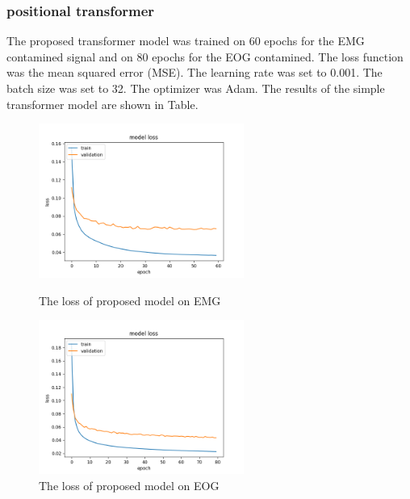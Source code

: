 \documentclass[a4paper]{sapthesis}
\begin{document}
\subsubsection{positional transformer}\label{sec:positional_transformer}
The proposed transformer  model was trained on 60 
epochs for the EMG contamined signal and on 80 epochs 
for the EOG contamined. The loss function was the mean squared error (MSE). The 
learning rate
was set to 0.001. The batch size was set to 32. The optimizer was Adam. 
The results of the simple transformer model are shown in Table.
\begin{figure}[h!]
\centering
\includegraphics[width=0.6\textwidth]{pt_EMG_loss.png}
\caption{The loss of proposed model on EMG}
\includegraphics[width=0.6\textwidth]{pt_EOG_loss.png}
\caption{The loss of proposed model on EOG}
\label{fig:simple_transformer}
\end{figure}
\end{document}
